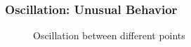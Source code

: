 \documentclass[aspectratio=169]{beamer}
\begin{document}
  \begin{frame}
    \frametitle{Oscillation: Unusual Behavior}
    \begin{figure}[h]
      \begin{center}
	\caption{Oscillation between different points}	
      \end{center}
    \end{figure}
  \end{frame}
  
\end{document}
